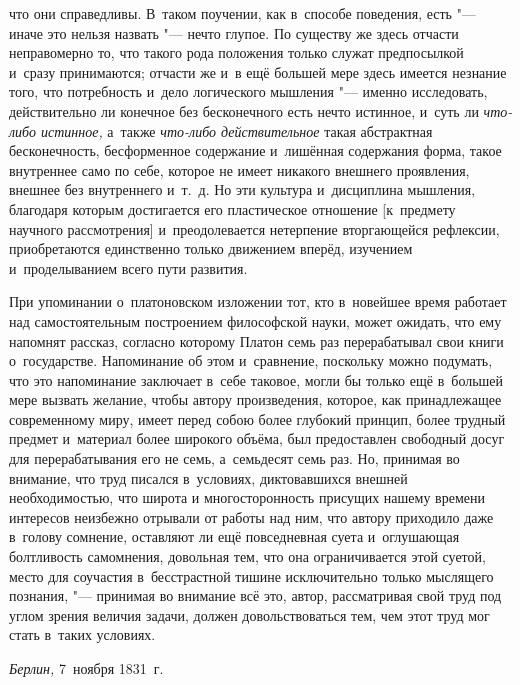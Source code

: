 что они справедливы. В~таком поучении, как в~способе поведения, есть
"--- иначе это нельзя назвать "--- нечто глупое. По существу же здесь
отчасти неправомерно то, что такого рода положения только служат предпосылкой
и~сразу принимаются; отчасти же и~в ещё большей мере здесь имеется
незнание того, что потребность и~дело логического мышления "--- именно
исследовать, действительно ли конечное без бесконечного есть нечто
истинное, и~суть ли {\em что-либо истинное,} а~также
{\em что-либо действительное} такая абстрактная бесконечность, бесформенное
содержание и~лишённая содержания форма, такое внутреннее само по себе, которое не
имеет никакого внешнего проявления, внешнее без внутреннего и~т.~д. Но эти культура и~дисциплина
мышления, благодаря которым достигается его пластическое отношение [к~предмету
научного рассмотрения] и~преодолевается нетерпение вторгающейся рефлексии,
приобретаются единственно только движением вперёд, изучением и~проделыванием
всего пути развития.

При упоминании о~платоновском изложении тот, кто в~новейшее время работает над
самостоятельным построением философской науки, может ожидать, что ему напомнят
рассказ, согласно которому Платон семь раз перерабатывал свои книги
о~государстве. Напоминание об этом и~сравнение, поскольку можно подумать, что
это напоминание заключает в~себе таковое, могли бы только ещё в~большей мере
вызвать желание, чтобы автору произведения, которое, как принадлежащее
современному миру, имеет перед собою более глубокий принцип, более трудный
предмет и~материал более широкого объёма, был предоставлен свободный досуг для
перерабатывания его не семь, а~семьдесят семь раз. Но, принимая во внимание,
что труд писался в~условиях, диктовавшихся внешней необходимостью, что широта и
многосторонность присущих нашему времени интересов неизбежно отрывали от работы над ним,
что автору приходило даже в~голову сомнение, оставляют ли ещё повседневная
суета и~оглушающая болтливость самомнения, довольная тем, что она
ограничивается этой суетой, место для соучастия в~бесстрастной
тишине исключительно только мыслящего познания, "--- принимая во внимание
всё это, автор, рассматривая свой труд под углом зрения величия задачи, должен
довольствоваться тем, чем этот труд мог стать в~таких условиях.

{\em Берлин,} 7~ноября 1831~г.

\bigskip
